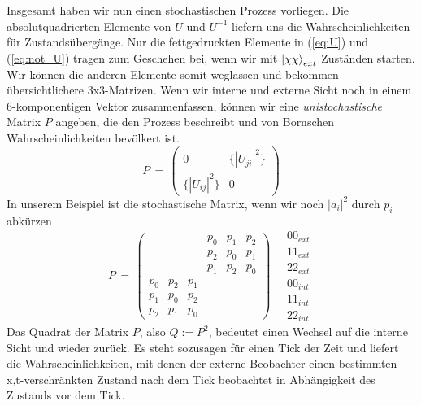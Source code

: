 \documentclass[12pt]{article}
\begin{document}
Insgesamt haben wir nun einen stochastischen Prozess vorliegen. Die absolutquadrierten Elemente von $U$ und $U^{-1}$ liefern uns die Wahrscheinlichkeiten für Zustandsübergänge. Nur die fettgedruckten Elemente in (\ref{eq:U}) und (\ref{eq:not_U}) tragen zum Geschehen bei, wenn wir mit $\ket{\chi\chi}_{ext}$ Zuständen starten. Wir können die anderen Elemente somit weglassen und bekommen übersichtlichere 3x3-Matrizen. Wenn wir interne und externe Sicht noch in einem 6-komponentigen Vektor zusammenfassen, können wir eine \emph{unistochastische} Matrix $P$ angeben, die den Prozess beschreibt und von Bornschen Wahrscheinlichkeiten bevölkert ist.
\begin{equation}
P\, =\,
\begin{pmatrix}
0 & \{|U_{ji}|^2\} \\
\{|U_{ij}|^2\} & 0
\end{pmatrix}
\end{equation}
In unserem Beispiel ist die stochastische Matrix, wenn wir noch $|a_i|^2$ durch $p_i$ abkürzen
\begin{equation}
P\, =\,
\begin{pmatrix}
&&& p_0 & p_1 & p_2 \\
&&& p_2 & p_0 & p_1 \\
&&& p_1 & p_2 & p_0 \\
p_0 & p_2 & p_1 &&& \\
p_1 & p_0 & p_2 &&& \\
p_2 & p_1 & p_0 &&& 
\end{pmatrix}
\quad
\begin{matrix}
00_{ext} \\ 11_{ext} \\ 22_{ext} \\ 00_{int} \\ 11_{int} \\ 22_{int}
\end{matrix}
\end{equation}
Das Quadrat der Matrix $P$, also $Q:=P^2$, bedeutet einen Wechsel auf die interne Sicht und wieder zurück. Es steht sozusagen für einen Tick der Zeit und liefert die Wahrscheinlichkeiten, mit denen der externe Beobachter einen bestimmten x,t-verschränkten Zustand nach dem Tick beobachtet in Abhängigkeit des Zustands vor dem Tick.
\end{document}
